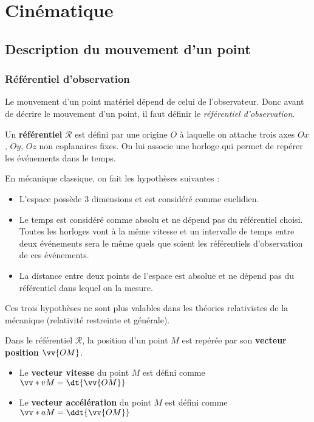 \documentclass{cours}
\begin{document}
\setcounter{chapter}{9}
\chapter{Cinématique}
\section{Description du mouvement d'un point}%
\label{sec:description_du_mouvement_d_un_point}

\subsection{Référentiel d'observation}%
\label{sub:referentiel_d_observation}

Le mouvement d'un point matériel dépend de celui de l'observateur. Donc avant de décrire le mouvement d'un point, il faut définir le \emph{référentiel d'observation}.

\begin{definition}
Un \textbf{référentiel} $\mathcal{R}$ est défini par une origine $O$ à laquelle on attache trois axes $Ox$, $Oy$, $Oz$ non coplanaires fixes. On lui associe une horloge qui permet de repérer les événements dans le temps. 
\end{definition}

En mécanique classique, on fait les hypothèses suivantes :
\begin{itemize}
  \item L'espace possède 3 dimensions et est considéré comme euclidien. 
  \item Le temps est considéré comme absolu et ne dépend pas du référentiel choisi. Toutes les horloges vont à la même vitesse et un intervalle de temps entre deux événements sera le même quels que soient les référentiels d'observation de ces événements.
  \item La distance entre deux points de l'espace est absolue et ne dépend pas du référentiel dans lequel on la mesure. 
\end{itemize}

Ces trois hypothèses ne sont plus valables dans les théories relativistes de la mécanique (relativité restreinte et générale).

Dans le référentiel $\mathcal{R}$, la position d'un point $M$ est repérée par son \textbf{vecteur position} $\vv{OM}$. 
\begin{itemize}
  \item Le \textbf{vecteur vitesse} du point $M$ est défini comme $\vv*{v}{M} = \dt{\vv{OM}}$  
  \item Le \textbf{vecteur accélération} du point $M$ est défini comme $\vv*{a}{M} = \ddt{\vv{OM}}$  
\end{itemize}
\end{document}
